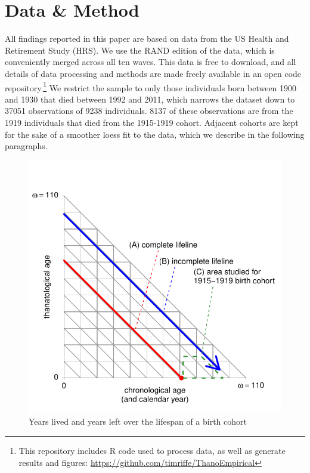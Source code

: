 \documentclass[11pt,oneside]{article} %
\begin{document}
\section*{Data \& Method}

All findings reported in this paper are based on data from the US Health and
Retirement Study (HRS). We use the RAND edition of the data, which is
conveniently merged across all ten waves. This data is free to download,
and all details of data processing and methods are made freely available in an open code
repository.\footnote{This
repository includes R code used to process data, as well as generate results and
figures: \url{https://github.com/timriffe/ThanoEmpirical}}
We restrict the sample to only those
individuals born between 1900 and 1930 that died between 1992 and 2011, which narrows the dataset down to 37051 observations of 9238 individuals. 8137 of these observations are from the 1919 individuals that died from the 1915-1919 cohort. Adjacent cohorts are kept for the sake of a smoother loess fit to the data, which we describe in the following paragraphs.
%
\begin{figure}[!h]
\centering
\caption{Years lived and years left over the lifespan of a birth cohort}
\label{fig:LexisOrtho}
	\includegraphics{Figures/LexisOrtho.pdf}
\end{figure}
\end{document}
